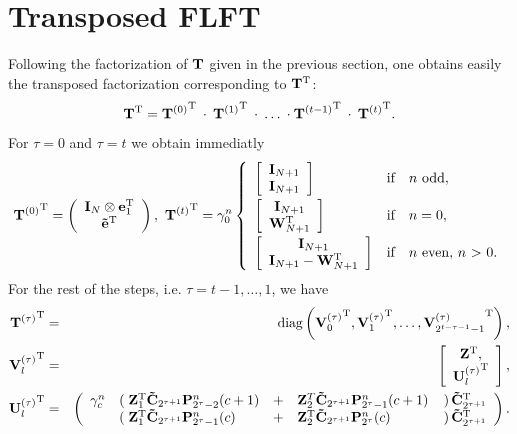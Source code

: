 \section{Transposed FLFT}
Following the factorization of $\mathbf{T}$ given in the previous section, one obtains easily the transposed factorization corresponding to $\mathbf{T^{\text{\rm{T}}}}$:
$$
  \mathbf{T}^{\text{\rm{T}}} = {\mathbf{T}^{(0)}}^{\text{\rm{T}}} \: \cdot \: {\mathbf{T}^{(1)}}^{\text{\rm{T}}} \: \cdot \: \ldots \: \cdot {\mathbf{T}^{(t-1)}}^{\text{\rm{T}}} \: \cdot \: {\mathbf{T}^{(t)}}^{\text{\rm{T}}}.
$$ 
For $\tau = 0$ and $\tau = t$ we obtain immediatly
$$
  {\V{T}^{(0)}}^{\transp} = 
     \left(\begin{array}{c} 
       \V{I}_{N} \otimes \V{e}_{1}^{\transp}\\ 
       \V{\tilde{e}}^{\transp} 
     \end{array}\right),\  
   {\V{T}^{(t)}}^{\transp} = \gamma_{0}^n 
     \left\{\begin{array}{l@{\quad \text{if} \quad}l} 
       \left[ \begin{array}{c} \V{I}_{N+1} \\ \V{I}_{N+1}                         \end{array} \right] & \text{$n$ odd},          \\[2ex]
       \left[ \begin{array}{c} \V{I}_{N+1} \\               \V{W}_{N+1}^{\transp} \end{array} \right] & \text{$n = 0$},          \\[2ex]
       \left[ \begin{array}{c} \V{I}_{N+1} \\ \V{I}_{N+1} - \V{W}_{N+1}^{\transp} \end{array} \right] & \text{$n$ even, $n$ > 0}.
     \end{array}\right.
$$
For the rest of the steps, i.e. $\tau = t-1,\ldots,1$, we have
\begin{eqnarray*}
 {\mathbf{T}^{(\tau)}}^{\text{\rm{T}}}   & = & \text{diag}\left({\mathbf{V}^{(\tau)}_0}^{\text{\rm{T}}},{\mathbf{V}^{(\tau)}_1}^{\text{\rm{T}}},\dots,{\mathbf{V}^{(\tau)}_{2^{t-\tau-1}-1}}^{\text{\rm{T}}}\right),\\
 {\mathbf{V}^{(\tau)}_l}^{\text{\rm{T}}} & = & \left[ \begin{array}{c} \mathbf{Z}^{\text{\rm{T}}},\\ 
 {\mathbf{U}^{(\tau)}_l}^{\text{\rm{T}}} \end{array} \right],\\
 {\mathbf{U}^{(\tau)}_l}^{\text{\rm{T}}} & = &
   \left(\begin{array}{rlllr}
     \gamma_{c}^n & \left(\right. \mathbf{Z}_{1}^{\text{\rm{T}}} \mathbf{\tilde{C}}_{2^{\tau+1}} \mathbf{P}_{2^{\tau}-2}^n{\hspace{-0.4ex}}\left(c+1\right) & + & \mathbf{Z}_{2}^T \mathbf{\tilde{C}}_{2^{\tau+1}} \mathbf{P}_{2^{\tau}-1}^n{\hspace{-0.4ex}}\left(c+1\right)                  & \left.\right) \mathbf{\tilde{C}}_{2^{\tau+1}}^{\text{\rm{T}}} \\
                  & \left(\right. \mathbf{Z}_{1}^{\text{\rm{T}}} \mathbf{\tilde{C}}_{2^{\tau+1}} \mathbf{P}_{2^{\tau}-1}^n{\hspace{-0.4ex}}\left(c\right) & + & \mathbf{Z}_{2}^{\text{\rm{T}}} \mathbf{\tilde{C}}_{2^{\tau+1}} \mathbf{P}_{2^{\tau}}^n{\hspace{-0.4ex}}\left(c\right) & \left.\right) \mathbf{\tilde{C}}_{2^{\tau+1}}^{\text{\rm{T}}}
     \end{array}
   \right).
\end{eqnarray*}

